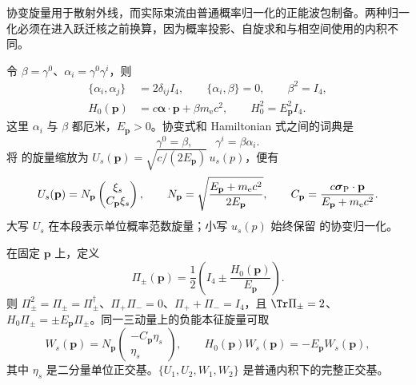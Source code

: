 协变旋量用于散射外线，而实际束流由普通概率归一化的正能波包制备。两种归一化必须在进入跃迁核之前换算，因为概率投影、自旋求和与相空间使用的内积不同。

\begin{definition}
令 $\beta=\gamma^0$、$\alpha_i=\gamma^0\gamma^i$，则
\begin{align}
 \{\alpha_i,\alpha_j\}&=2\delta_{ij}I_4,\qquad
 \{\alpha_i,\beta\}=0,\qquad \beta^2=I_4,
 \label{eq:feqo-dirac-anticommutators}\\
 H_0(\mathbf p)&=c\boldsymbol\alpha\cdot\mathbf p+\beta m_{\mathrm e}c^2,
 \qquad H_0^2=E_{\mathbf p}^2I_4.
 \label{eq:feqo-dirac-free}
\end{align}
这里 $\alpha_i$ 与 $\beta$ 都厄米，$E_{\mathbf p}>0$。协变式和 Hamiltonian 式之间的词典是
\begin{equation}
 \gamma^0=\beta,\qquad \gamma^i=\beta\alpha_i.
 \label{eq:feqo-gamma-dictionary}
\end{equation}
将 的旋量缩放为 $U_s(\mathbf p)=\sqrt{c/(2E_{\mathbf p})}\,u_s(p)$，便有
\begin{equation}
 U_s(\mathbf p)=N_{\mathbf p}
 \begin{pmatrix}\xi_s\\ C_{\mathbf p}\xi_s\end{pmatrix},
 \qquad
 N_{\mathbf p}=\sqrt{\frac{E_{\mathbf p}+m_{\mathrm e}c^2}{2E_{\mathbf p}}},
 \qquad
 C_{\mathbf p}=\frac{c\boldsymbol\sigma_{\rm P}\cdot\mathbf p}
 {E_{\mathbf p}+m_{\mathrm e}c^2}.
 \label{eq:feqo-positive-spinor}
\end{equation}
大写 $U_s$ 在本段表示单位概率范数旋量；小写 $u_s(p)$ 始终保留 的协变归一化。
\end{definition}

\begin{proposition}[同一动量上的正交能量分解]
在固定 $\mathbf p$ 上，定义
\begin{equation}
 \Pi_\pm(\mathbf p)=\frac12\left(I_4\pm\frac{H_0(\mathbf p)}{E_{\mathbf p}}\right).
 \label{eq:feqo-hamiltonian-energy-projectors}
\end{equation}
则 $\Pi_\pm^2=\Pi_\pm=\Pi_\pm^\dagger$、$\Pi_+\Pi_-=0$、$\Pi_++\Pi_-=I_4$，且 $\Tr\Pi_\pm=2$、$H_0\Pi_\pm=\pm E_{\mathbf p}\Pi_\pm$。同一三动量上的负能本征旋量可取
\begin{equation}
 W_s(\mathbf p)=N_{\mathbf p}
 \begin{pmatrix}-C_{\mathbf p}\eta_s\\\eta_s\end{pmatrix},
 \qquad H_0(\mathbf p)W_s(\mathbf p)=-E_{\mathbf p}W_s(\mathbf p),
 \label{eq:feqo-negative-hamiltonian-spinor}
\end{equation}
其中 $\eta_s$ 是二分量单位正交基。$\{U_1,U_2,W_1,W_2\}$ 是普通内积下的完整正交基。
\end{proposition}


